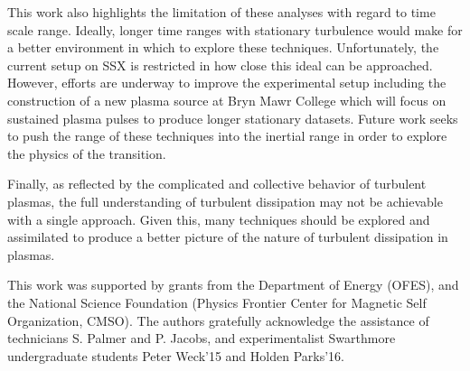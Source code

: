 \documentclass[aip,pop,amsmath,amssymb,preprint,superscriptaddress]{revtex4-1} %
\begin{document}
This work also highlights the limitation of these analyses with regard to time scale range. Ideally, longer time ranges with stationary turbulence would make for a better environment in which to explore these techniques. Unfortunately, the current setup on SSX is restricted in how close this ideal can be approached. However, efforts are underway to improve the experimental setup including the construction of a new plasma source at Bryn Mawr College which will focus on sustained plasma pulses to produce longer stationary datasets. Future work seeks to push the range of these techniques into the inertial range in order to explore the physics of the transition.

Finally, as reflected by the complicated and collective behavior of turbulent plasmas, the full understanding of turbulent dissipation may not be achievable with a single approach. Given this, many techniques should be explored and assimilated to produce a better picture of the nature of turbulent dissipation in plasmas.

\acknowledgements

This work was supported by grants from the Department
of Energy (OFES), and the National Science Foundation
(Physics Frontier Center for Magnetic Self Organization,
CMSO). The authors gratefully acknowledge the assistance of technicians
S. Palmer and P. Jacobs, and experimentalist Swarthmore undergraduate students Peter Weck'15 and Holden Parks'16.
\end{document}
